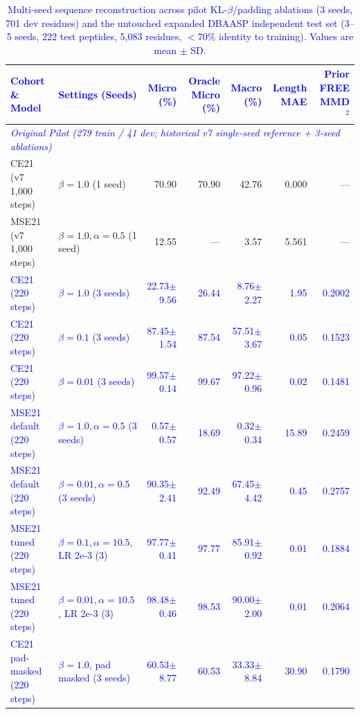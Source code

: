 \documentclass[unnumsec,webpdf,contemporary,large]{oup-authoring-template}
\newcommand{\rev}[1]{\textcolor{blue}{#1}}
\begin{document}
\begin{table}[t]
\caption{\rev{Multi-seed sequence reconstruction across pilot KL-$\beta$/padding ablations (3 seeds, 701 dev residues) and the untouched expanded DBAASP independent test set (3--5 seeds, 222 test peptides, 5,083 residues, $<$70\% identity to training). Values are mean $\pm$ SD.}}
\label{tab:reconstruction}
\centering
\footnotesize
\begin{tabular}{llrrrrr}
\toprule
\rev{Cohort \& Model} & \rev{Settings (Seeds)} & \rev{Micro (\%)} & \rev{Oracle Micro (\%)} & \rev{Macro (\%)} & \rev{Length MAE} & \rev{Prior FREE MMD$^2$} \\
\midrule
\multicolumn{7}{l}{\textit{\rev{Original Pilot (279 train / 41 dev; historical v7 single-seed reference + 3-seed ablations)}}} \\
CE21 (v7 1,000 steps) & $\beta=1.0$ (1 seed) & 70.90 & 70.90 & 42.76 & 0.000 & --- \\
MSE21 (v7 1,000 steps) & $\beta=1.0, \alpha=0.5$ (1 seed) & 12.55 & --- & 3.57 & 5.561 & --- \\
\rev{CE21 (220 steps)} & \rev{$\beta=1.0$ (3 seeds)} & \rev{22.73$\pm$9.56} & \rev{26.44} & \rev{8.76$\pm$2.27} & \rev{1.95} & \rev{0.2002} \\
\rev{CE21 (220 steps)} & \rev{$\beta=0.1$ (3 seeds)} & \rev{87.45$\pm$1.54} & \rev{87.54} & \rev{57.51$\pm$3.67} & \rev{0.05} & \rev{0.1523} \\
\rev{CE21 (220 steps)} & \rev{$\beta=0.01$ (3 seeds)} & \rev{99.57$\pm$0.14} & \rev{99.67} & \rev{97.22$\pm$0.96} & \rev{0.02} & \rev{0.1481} \\
\rev{MSE21 default (220 steps)} & \rev{$\beta=1.0, \alpha=0.5$ (3 seeds)} & \rev{0.57$\pm$0.57} & \rev{18.69} & \rev{0.32$\pm$0.34} & \rev{15.89} & \rev{0.2459} \\
\rev{MSE21 default (220 steps)} & \rev{$\beta=0.01, \alpha=0.5$ (3 seeds)} & \rev{90.35$\pm$2.41} & \rev{92.49} & \rev{67.45$\pm$4.42} & \rev{0.45} & \rev{0.2757} \\
\rev{MSE21 tuned (220 steps)} & \rev{$\beta=0.1, \alpha=10.5$, LR 2e-3 (3)} & \rev{97.77$\pm$0.41} & \rev{97.77} & \rev{85.91$\pm$0.92} & \rev{0.01} & \rev{0.1884} \\
\rev{MSE21 tuned (220 steps)} & \rev{$\beta=0.01, \alpha=10.5$, LR 2e-3 (3)} & \rev{98.48$\pm$0.46} & \rev{98.53} & \rev{90.00$\pm$2.00} & \rev{0.01} & \rev{0.2064} \\
\rev{CE21 pad-masked (220 steps)} & \rev{$\beta=1.0$, pad masked (3 seeds)} & \rev{60.53$\pm$8.77} & \rev{60.53} & \rev{33.33$\pm$8.84} & \rev{30.90} & \rev{0.1790} \\

\end{tabular}
\end{table}
\end{document}
